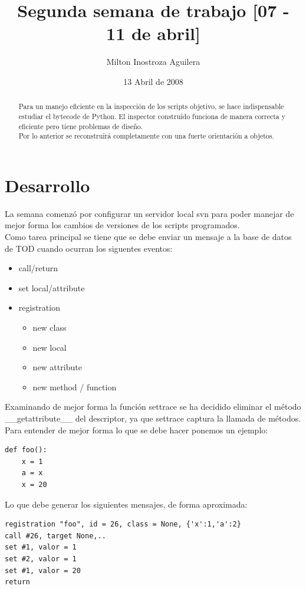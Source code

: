 \documentclass[10pt,a4paper]{article}
\begin{document}
\title{Segunda semana de trabajo [07 - 11 de abril]}
\author{Milton Inostroza Aguilera}
\date{13 Abril de 2008}
\clearpage
\maketitle

\begin{abstract}
Para un manejo eficiente en la inspección de los scripts objetivo, se hace indispensable estudiar el bytecode de Python.  El inspector construído funciona de manera correcta y eficiente pero tiene problemas de diseño.\\

Por lo anterior se reconstruirá completamente con una fuerte orientación a objetos.
\end{abstract}
\pagebreak
\section{Desarrollo}
La semana comenzó por configurar un servidor local svn para poder manejar de mejor forma los cambios de versiones de los scripts programados.\\

Como tarea principal se tiene que se debe enviar un mensaje a la base de datos de TOD cuando ocurran los siguentes eventos:
\begin{itemize}
\item call/return
\item set local/attribute
\item registration
	\begin{itemize}
	\item new class
	\item new local
	\item new attribute
	\item new method / function
	\end{itemize} 
\end{itemize}

Examinando de mejor forma la función settrace se ha decidido eliminar el método \_\_getattribute\_\_ del descriptor, ya que settrace captura la llamada de métodos.\\

Para entender de mejor forma lo que se debe hacer ponemos un ejemplo:
\begin{verbatim}
def foo():
    x = 1
    a = x
    x = 20
\end{verbatim}

Lo que debe generar los siguientes mensajes, de forma aproximada:
\begin{verbatim}
registration "foo", id = 26, class = None, {'x':1,'a':2}
call #26, target None,..
set #1, valor = 1
set #2, valor = 1
set #1, valor = 20
return
\end{verbatim}
\end{document}
